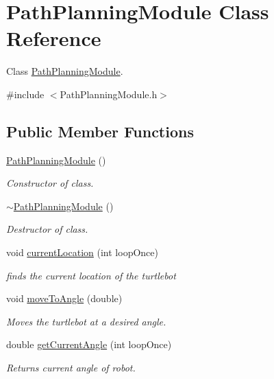 \hypertarget{class_path_planning_module}{}\section{Path\+Planning\+Module Class Reference}
\label{class_path_planning_module}


Class \mbox{\hyperlink{class_path_planning_module}{Path\+Planning\+Module}}.  




{\ttfamily \#include $<$Path\+Planning\+Module.\+h$>$}

\subsection*{Public Member Functions}
\begin{DoxyCompactItemize}
\item 
\mbox{\hyperlink{class_path_planning_module_a45510d19b199ab89cecc1bf6e8b252eb}{Path\+Planning\+Module}} ()
\begin{DoxyCompactList}\small\item\em Constructor of class. \end{DoxyCompactList}\item 
\mbox{\hyperlink{class_path_planning_module_acc73ccfa18e08a1771b72bb418d96258}{$\sim$\+Path\+Planning\+Module}} ()
\begin{DoxyCompactList}\small\item\em Destructor of class. \end{DoxyCompactList}\item 
void \mbox{\hyperlink{class_path_planning_module_a49c334a5359a2ba96d483c86bbcca1b4}{current\+Location}} (int loop\+Once)
\begin{DoxyCompactList}\small\item\em finds the current location of the turtlebot \end{DoxyCompactList}\item 
void \mbox{\hyperlink{class_path_planning_module_a670b9233e62542af0b94a145b489f606}{move\+To\+Angle}} (double)
\begin{DoxyCompactList}\small\item\em Moves the turtlebot at a desired angle. \end{DoxyCompactList}\item 
double \mbox{\hyperlink{class_path_planning_module_ad849d7f34033bd02d65fb377cdb0c9c7}{get\+Current\+Angle}} (int loop\+Once)
\begin{DoxyCompactList}\small\item\em Returns current angle of robot. \end{DoxyCompactList}\item 

\end{DoxyCompactItemize}
